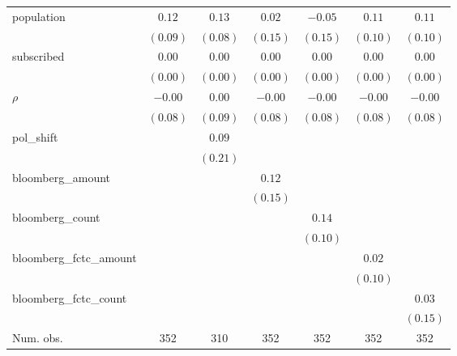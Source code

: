 \begin{table}[!h]
\begin{center}
\begin{tabular}{l c c c c c c }
population              & $0.12$       & $0.13$       & $0.02$       & $-0.05$      & $0.11$       & $0.11$       \\
                        & $(0.09)$     & $(0.08)$     & $(0.15)$     & $(0.15)$     & $(0.10)$     & $(0.10)$     \\
subscribed              & $0.00$       & $0.00$       & $0.00$       & $0.00$       & $0.00$       & $0.00$       \\
                        & $(0.00)$     & $(0.00)$     & $(0.00)$     & $(0.00)$     & $(0.00)$     & $(0.00)$     \\
$\rho$                  & $-0.00$      & $0.00$       & $-0.00$      & $-0.00$      & $-0.00$      & $-0.00$      \\
                        & $(0.08)$     & $(0.09)$     & $(0.08)$     & $(0.08)$     & $(0.08)$     & $(0.08)$     \\
pol\_shift              &              & $0.09$       &              &              &              &              \\
                        &              & $(0.21)$     &              &              &              &              \\
bloomberg\_amount       &              &              & $0.12$       &              &              &              \\
                        &              &              & $(0.15)$     &              &              &              \\
bloomberg\_count        &              &              &              & $0.14$       &              &              \\
                        &              &              &              & $(0.10)$     &              &              \\
bloomberg\_fctc\_amount &              &              &              &              & $0.02$       &              \\
                        &              &              &              &              & $(0.10)$     &              \\
bloomberg\_fctc\_count  &              &              &              &              &              & $0.03$       \\
                        &              &              &              &              &              & $(0.15)$     \\
\midrule
Num. obs.               & 352          & 310          & 352          & 352          & 352          & 352          \\

\end{tabular}
\end{center}
\end{table}
